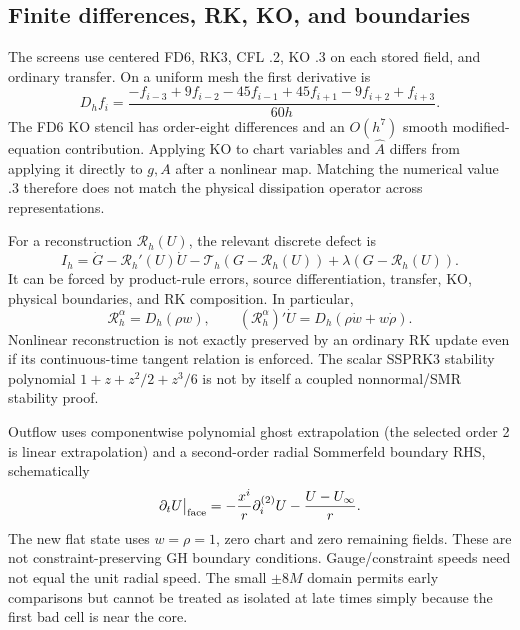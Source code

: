 \documentclass[11pt,letterpaper]{article}
\begin{document}
\subsection{Finite differences, RK, KO, and boundaries}
The screens use centered FD6, RK3, CFL .2, KO .3 on each stored field, and ordinary transfer. On a uniform mesh the first derivative is
\begin{equation}
D_hf_i=\frac{-f_{i-3}+9f_{i-2}-45f_{i-1}+45f_{i+1}-9f_{i+2}+f_{i+3}}{60h}.
\end{equation}
The FD6 KO stencil has order-eight differences and an $O(h^7)$ smooth modified-equation contribution. Applying KO to chart variables and $\widehat A$ differs from applying it directly to $g,A$ after a nonlinear map. Matching the numerical value .3 therefore does not match the physical dissipation operator across representations.

For a reconstruction $\mathcal R_h(U)$, the relevant discrete defect is
\begin{equation}
I_h=\dot G-\mathcal R_h'(U)\dot U-\mathcal T_h(G-\mathcal R_h(U))
+\lambda(G-\mathcal R_h(U)).
\end{equation}
It can be forced by product-rule errors, source differentiation, transfer, KO, physical boundaries, and RK composition. In particular,
\begin{equation}
\mathcal R_h^\alpha=D_h(\rho w),\qquad
(\mathcal R_h^\alpha)'\dot U=D_h(\rho\dot w+w\dot\rho).
\end{equation}
Nonlinear reconstruction is not exactly preserved by an ordinary RK update even if its continuous-time tangent relation is enforced. The scalar SSPRK3 stability polynomial $1+z+z^2/2+z^3/6$ is not by itself a coupled nonnormal/SMR stability proof.

Outflow uses componentwise polynomial ghost extrapolation (the selected order 2 is linear extrapolation) and a second-order radial Sommerfeld boundary RHS, schematically
\begin{equation}
\partial_tU\big|_{\rm face}=-\frac{x^i}{r}\partial_i^{(2)}U-\frac{U-U_\infty}{r}.
\end{equation}
The new flat state uses $w=\rho=1$, zero chart and zero remaining fields. These are not constraint-preserving GH boundary conditions. Gauge/constraint speeds need not equal the unit radial speed. The small $\pm8M$ domain permits early comparisons but cannot be treated as isolated at late times simply because the first bad cell is near the core.
\end{document}
